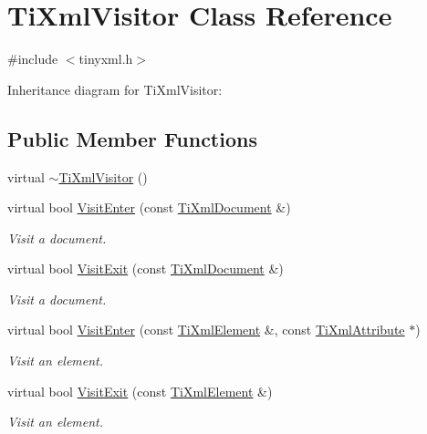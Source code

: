 \hypertarget{class_ti_xml_visitor}{\section{Ti\+Xml\+Visitor Class Reference}
\label{class_ti_xml_visitor}
}


{\ttfamily \#include $<$tinyxml.\+h$>$}



Inheritance diagram for Ti\+Xml\+Visitor\+:
\subsection*{Public Member Functions}
\begin{DoxyCompactItemize}
\item 
virtual \hyperlink{class_ti_xml_visitor_a276c739ec4701f27c3f86b8ead095e5a}{$\sim$\+Ti\+Xml\+Visitor} ()
\item 
virtual bool \hyperlink{class_ti_xml_visitor_a07baecb52dd7d8716ae2a48ad0956ee0}{Visit\+Enter} (const \hyperlink{class_ti_xml_document}{Ti\+Xml\+Document} \&)
\begin{DoxyCompactList}\small\item\em Visit a document. \end{DoxyCompactList}\item 
virtual bool \hyperlink{class_ti_xml_visitor_aa0ade4f27087447e93974e975c3246ad}{Visit\+Exit} (const \hyperlink{class_ti_xml_document}{Ti\+Xml\+Document} \&)
\begin{DoxyCompactList}\small\item\em Visit a document. \end{DoxyCompactList}\item 
virtual bool \hyperlink{class_ti_xml_visitor_af6c6178ffa517bbdba95d70490875fff}{Visit\+Enter} (const \hyperlink{class_ti_xml_element}{Ti\+Xml\+Element} \&, const \hyperlink{class_ti_xml_attribute}{Ti\+Xml\+Attribute} $\ast$)
\begin{DoxyCompactList}\small\item\em Visit an element. \end{DoxyCompactList}\item 
virtual bool \hyperlink{class_ti_xml_visitor_aec2b1f8116226d52f3a1b95dafd3a32c}{Visit\+Exit} (const \hyperlink{class_ti_xml_element}{Ti\+Xml\+Element} \&)
\begin{DoxyCompactList}\small\item\em Visit an element. \end{DoxyCompactList}\item 

\end{DoxyCompactItemize}
